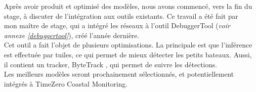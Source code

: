 Après avoir produit et optimisé des modèles, nous avons commencé, vers la fin du stage, 
à discuter de l'intégration aux outils existants. Ce travail a été fait par mon maître de stage, 
qui a intégré les réseaux à l'outil DebuggerTool (\textit{voir annexe \ref{debuggertool}}), 
créé l'année dernière.\\ 

Cet outil a fait l'objet de plusieurs optimisations. La principale est que l'inférence est effectuée par tuiles, 
ce qui permet de mieux détecter les petits bateaux. Aussi, il contient un tracker, ByteTrack \cite{Zhang_Sun_Jiang_Yu_Weng_Yuan_Luo_Liu_Wang_2022}, 
qui permet de suivre les détections.\\ 

Les meilleurs modèles seront prochainement sélectionnés, 
et potentiellement intégrés à TimeZero Coastal Monitoring.
